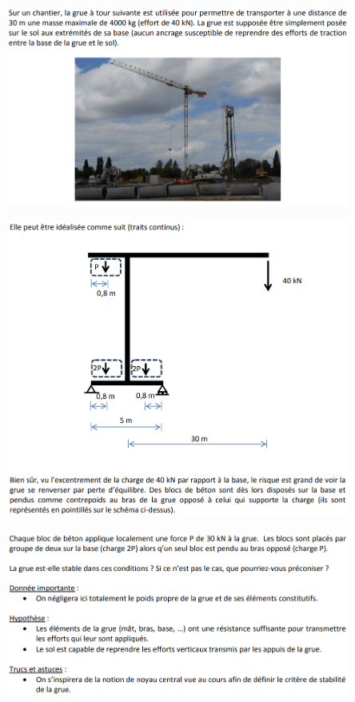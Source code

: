\documentclass[a4paper]{article}
\begin{document}
\begin{center}
\includegraphics[width=0.85\textwidth]{images/enoncegrue01.PNG}
\end{center}
\begin{center}
\includegraphics[width=0.85\textwidth]{images/enoncegrue02.PNG}
\end{center}
\begin{center}
\includegraphics[width=0.85\textwidth]{images/enoncegrue03.PNG}
\end{center}
\end{document}
